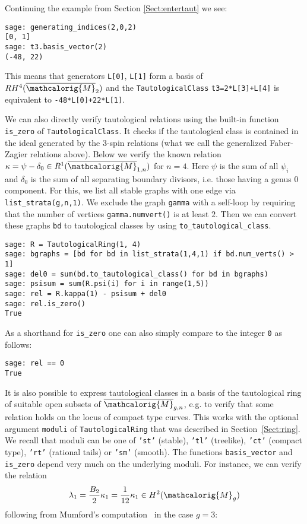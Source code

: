 \documentclass[11pt]{article}
\newcommand{\M}{\ensuremath{\overline{\mathcalorig{M}}}}
\begin{document}
Continuing the example from Section \ref{Sect:entertaut} we see:
\begin{lstlisting}
sage: generating_indices(2,0,2)
[0, 1]
sage: t3.basis_vector(2)
(-48, 22)
\end{lstlisting}
This means that generators \verb|L[0]|, \verb|L[1]|  form a basis of $RH^4(\M_2)$ and the \verb|TautologicalClass| \verb|t3=2*L[3]+L[4]| is equivalent to \verb|-48*L[0]+22*L[1]|.

We can also directly verify tautological relations using the built-in function \verb|is_zero| of \texttt{TautologicalClass}. It checks if the tautological class is contained in the ideal generated by the $3$-spin relations \cite{pandhapixton} (what we call the generalized Faber-Zagier relations above). Below we verify the known relation $\kappa = \psi - \delta_0 \in R^1(\M_{1,n})$ for $n=4$. Here $\psi$ is the sum of all $\psi_i$ and $\delta_0$ is the sum of all separating boundary divisors, i.e. those having a genus $0$ component. For this, we list all stable graphs with one edge via \verb|list_strata(g,n,1)|. We exclude the graph \verb|gamma| with a self-loop by requiring that the number of vertices \verb|gamma.numvert()| is at least $2$. Then we can convert these graphs \verb|bd| to tautological classes by using \verb|to_tautological_class|.
\begin{lstlisting}
sage: R = TautologicalRing(1, 4)
sage: bgraphs = [bd for bd in list_strata(1,4,1) if bd.num_verts() > 1]
sage: del0 = sum(bd.to_tautological_class() for bd in bgraphs)
sage: psisum = sum(R.psi(i) for i in range(1,5))
sage: rel = R.kappa(1) - psisum + del0
sage: rel.is_zero()
True
\end{lstlisting}
As a shorthand for \verb|is_zero| one can also simply compare to the integer \texttt{0} as follows:
\begin{lstlisting}
sage: rel == 0
True
\end{lstlisting}
It is also possible to express tautological classes in a basis of the tautological ring of suitable open subsets of $\M_{g,n}$, e.g. to verify that some relation holds on the locus of compact type curves. This works with the optional argument \texttt{moduli} of \texttt{TautologicalRing} that was described in Section~\ref{Sect:ring}. 
We recall that moduli can be one of \texttt{'st'} (stable), \texttt{'tl'} (treelike), \texttt{'ct'} (compact type), \texttt{'rt'} (rational tails) or \texttt{'sm'} (smooth). The functions \verb|basis_vector| and \verb|is_zero| depend very much on the underlying moduli. For instance, we can verify the relation \[\lambda_1 = \frac{B_2}{2} \kappa_1 = \frac{1}{12} \kappa_1 \in H^2(\mathcalorig{M}_g)\] following from Mumford's computation~\cite{mumfordtowards} in the case $g=3$:
\end{document}
